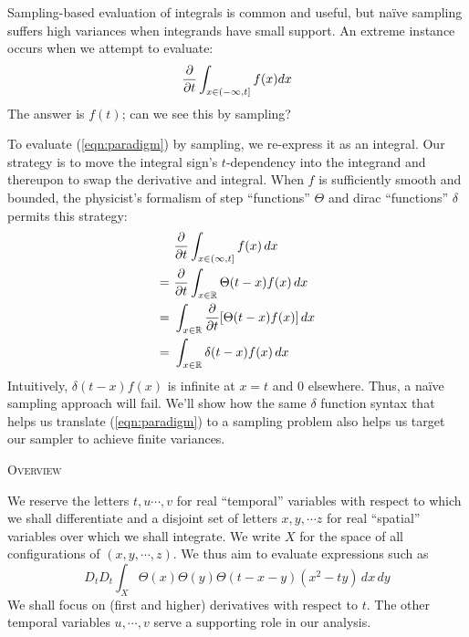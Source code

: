     Sampling-based evaluation of integrals is common and useful, but na\"ive
    sampling suffers high variances when integrands have small support.  An 
    extreme instance occurs when we attempt to evaluate:
    \begin{equation}\label{eqn:paradigm}
        \frac{\partial }{\partial t} \int_{x\in (-\infty,t]} f(x) dx 
    \end{equation}
    The answer is $f(t)$; can we see this by sampling?

    To evaluate (\ref{eqn:paradigm}) by sampling, we re-express it as an
    integral.  Our strategy is to move the integral sign's $t$-dependency into
    the integrand and thereupon to swap the derivative and integral.  
    When $f$ is sufficiently smooth and bounded, the physicist's formalism of
    step ``functions'' $\Theta$ and dirac
    ``functions'' $\delta$ permits this strategy:
    \begin{align*}
        &~\frac{\partial }{\partial t} \int_{x\in (\infty,t]} f(x) \,dx 
        \\=
        &~\frac{\partial }{\partial t} \int_{x\in {\mathbb R}}
            \Theta(t-x) f(x) \,dx 
        \\=
        &~\int_{x\in {\mathbb R}} \frac{\partial }{\partial t}
            [\Theta(t-x) f(x)] \,dx 
        \\=
        &~\int_{x\in {\mathbb R}} 
            \delta(t-x) f(x) \,dx 
    \end{align*}
    Intuitively, $\delta(t-x) f(x)$ is infinite at $x=t$ and $0$ elsewhere.
    Thus, a na\"ive sampling approach will fail.  We'll show how the same
    $\delta$ function syntax that helps us translate (\ref{eqn:paradigm}) to a
    sampling problem also helps us target our sampler to achieve finite
    variances.

\begin{center}\large\textsc{Overview}\end{center}

    We reserve the letters $t,u\cdots, v$ for real ``temporal'' variables with
    respect to which we shall differentiate and a disjoint set of letters
    $x,y,\cdots z$ for real ``spatial'' variables over which we shall
    integrate.  We write $X$ for the space of all configurations of
    $(x,y,\cdots,z)$.  We thus aim to evaluate expressions such as
    $$
        D_t D_t \int_X \Theta(x)\Theta(y)\Theta(t-x-y) (x^2-ty) \,dx\,dy
    $$
    We shall focus on (first and higher) derivatives with respect to $t$.  The
    other temporal variables $u,\cdots, v$ serve a supporting role in our
    analysis. 

